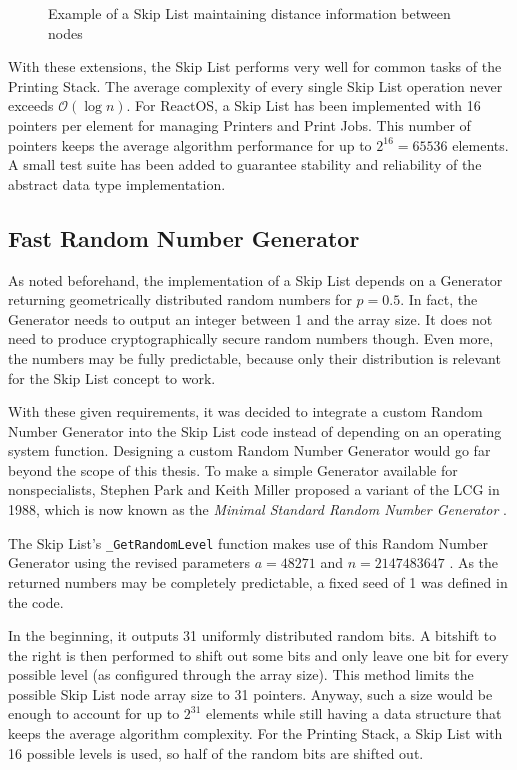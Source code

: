 \begin{figure}[t]
	\caption{Example of a Skip List maintaining distance information between nodes}
	\label{fig:SkipListWithDistance}
\end{figure}

With these extensions, the Skip List performs very well for common tasks of the Printing Stack.
The average complexity of every single Skip List operation never exceeds $\mathcal{O}(\log n)$.
For ReactOS, a Skip List has been implemented with 16 pointers per element for managing Printers and Print Jobs.
This number of pointers keeps the average algorithm performance for up to $2^{16} = 65536$ elements.
A small test suite has been added to guarantee stability and reliability of the abstract data type implementation.


\subsection{Fast Random Number Generator}
\label{sec:FastRNG}
As noted beforehand, the implementation of a Skip List depends on a Generator returning geometrically distributed random numbers for $p = 0.5$.
In fact, the Generator needs to output an integer between 1 and the array size.
It does not need to produce cryptographically secure random numbers though.
Even more, the numbers may be fully predictable, because only their distribution is relevant for the Skip List concept to work.

With these given requirements, it was decided to integrate a custom Random Number Generator into the Skip List code instead of depending on an operating system function.
Designing a custom Random Number Generator would go far beyond the scope of this thesis.
To make a simple Generator available for nonspecialists, Stephen Park and Keith Miller proposed a variant of the \gls{LCG} in 1988, which is now known as the \emph{Minimal Standard Random Number Generator} \cite{parkmiller1988rng}.

The Skip List's \texttt{\_GetRandomLevel} function makes use of this Random Number Generator using the revised parameters $a = 48271$ and $n = 2147483647$ \cite{parkmillerstockmeyer1993rng}.
As the returned numbers may be completely predictable, a fixed seed of 1 was defined in the code.

In the beginning, it outputs 31 uniformly distributed random bits.
A bitshift to the right is then performed to shift out some bits and only leave one bit for every possible level (as configured through the array size).
This method limits the possible Skip List node array size to 31 pointers.
Anyway, such a size would be enough to account for up to $2^{31}$ elements while still having a data structure that keeps the average algorithm complexity.
For the Printing Stack, a Skip List with 16 possible levels is used, so half of the random bits are shifted out.

